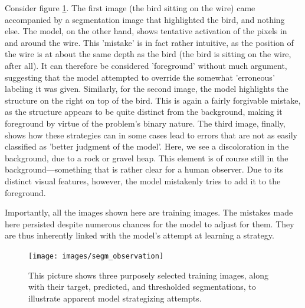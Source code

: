 	Consider figure \ref{fig:segm_observation}. The first image (the bird sitting on the wire) came accompanied by a segmentation image that highlighted the bird, and nothing else. The model, on the other hand, shows tentative activation of the pixels in and around the wire. This 'mistake' is in fact rather intuitive, as the position of the wire is at about the same depth as the bird (the bird is sitting on the wire, after all). It can therefore be considered 'foreground' without much argument, suggesting that the model attempted to override the somewhat 'erroneous' labeling it was given. Similarly, for the second image, the model highlights the structure on the right on top of the bird. This is again a fairly forgivable mistake, as the structure appears to be quite distinct from the background, making it foreground by virtue of the problem's binary nature. The third image, finally, shows how these strategies can in some cases lead to errors that are not as easily classified as 'better judgment of the model'. Here, we see a discoloration in the background, due to a rock or gravel heap. This element is of course still in the background---something that is rather clear for a human observer. Due to its distinct visual features, however, the model mistakenly tries to add it to the foreground. 
	
	Importantly, all the images shown here are training images. The mistakes made here persisted despite numerous chances for the model to adjust for them. They are thus inherently linked with the model's attempt at learning a strategy.

\begin{figure}[!htbp]
  \begin{center}
    \texttt{[image: images/segm\_observation]}
    \caption{This picture shows three purposely selected training images, along with their target, predicted, and thresholded segmentations, to illustrate apparent model strategizing attempts.}
    \label{fig:segm_observation}
  \end{center}
\end{figure}
